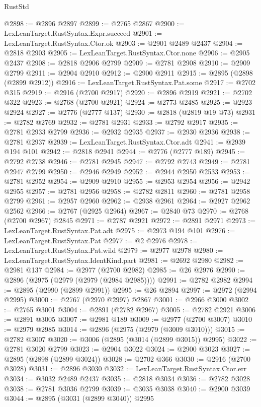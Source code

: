 \begin{lexlean}{RustStd}
\begin{coremodule}
@2898 := @2896 @2897
@2899 := @2765 @2867
@2900 := LexLeanTarget.RustSyntax.Expr.succeed
@2901 := LexLeanTarget.RustSyntax.Ctor.ok
@2903 := @2901 @2489 @2437
@2904 := @2818 @2903
@2905 := LexLeanTarget.RustSyntax.Ctor.none
@2906 := @2905 @2437
@2908 := @2818 @2906 @2799
@2909 := @2781 @2908
@2910 := @2909 @2799
@2911 := @2904 @2910
@2912 := @2900 @2911
@2915 := @2895 (@2898 (@2899 @2912))
@2916 := LexLeanTarget.RustSyntax.Pat.some
@2917 := @2702 @315
@2919 := @2916 (@2700 @2917)
@2920 := @2896 @2919
@2921 := @2702 @322
@2923 := @2768 (@2700 @2921)
@2924 := @2773 @2485
@2925 := @2923 @2924
@2927 := @2776 (@2777 @137)
@2930 := @2818 (@2819 @19 @73)
@2931 := @2782 @2769
@2932 := @2781 @2931
@2933 := @2792 @2917
@2935 := @2781 @2933 @2799
@2936 := @2932 @2935
@2937 := @2930 @2936
@2938 := @2781 @2937
@2939 := LexLeanTarget.RustSyntax.Ctor.adt
@2941 := @2939 @194 @101
@2942 := @2818 @2941
@2944 := @2776 (@2777 @189)
@2945 := @2792 @2738
@2946 := @2781 @2945
@2947 := @2792 @2743
@2949 := @2781 @2947 @2799
@2950 := @2946 @2949
@2952 := @2944 @2950 @2533
@2953 := @2781 @2952
@2954 := @2909 @2910
@2955 := @2953 @2954
@2956 := @2942 @2955
@2957 := @2781 @2956
@2958 := @2782 @2811
@2960 := @2781 @2958 @2799
@2961 := @2957 @2960
@2962 := @2938 @2961
@2964 := @2927 @2962 @2562
@2966 := @2767 (@2925 @2964)
@2967 := @2840 @73
@2970 := @2768 (@2700 @2967) @2845
@2971 := @2787 @2921
@2972 := @2891 @2971
@2973 := LexLeanTarget.RustSyntax.Pat.adt
@2975 := @2973 @194 @101
@2976 := LexLeanTarget.RustSyntax.Pat
@2977 := @2 @2976
@2978 := LexLeanTarget.RustSyntax.Pat.wild
@2979 := @2977 @2978
@2980 := LexLeanTarget.RustSyntax.IdentKind.part
@2981 := @2692 @2980
@2982 := @2981 @137
@2984 := @2977 (@2700 @2982)
@2985 := @26 @2976
@2990 := @2896 (@2975 (@2979 (@2979 (@2984 @2985))))
@2991 := @2782 @2982
@2994 := @2895 (@2990 (@2899 @2991))
@2995 := @26 @2894
@2997 := @2972 (@2994 @2995)
@3000 := @2767 (@2970 @2997) @2867
@3001 := @2966 @3000
@3002 := @2765 @3001
@3004 := @2891 (@2782 @2967)
@3005 := @2782 @2921
@3006 := @2891 @3005
@3007 := @2981 @189
@3009 := @2977 (@2700 @3007)
@3010 := @2979 @2985
@3014 := @2896 (@2975 (@2979 (@3009 @3010)))
@3015 := @2782 @3007
@3020 := @3006 (@2895 (@3014 (@2899 @3015)) @2995)
@3022 := @2781 @3020 @2799
@3023 := @2904 @3022
@3024 := @2900 @3023
@3027 := @2895 (@2898 (@2899 @3024))
@3028 := @2702 @366
@3030 := @2916 (@2700 @3028)
@3031 := @2896 @3030
@3032 := LexLeanTarget.RustSyntax.Ctor.err
@3034 := @3032 @2489 @2437
@3035 := @2818 @3034
@3036 := @2782 @3028
@3038 := @2781 @3036 @2799
@3039 := @3035 @3038
@3040 := @2900 @3039
@3044 := @2895 (@3031 (@2899 @3040)) @2995

\end{coremodule}
\end{lexlean}
